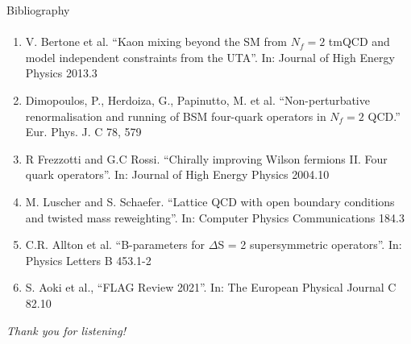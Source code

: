 \documentclass{beamer}
\begin{document}
\begin{frame}[noframenumbering]{Bibliography}
      \framesubtitle{\hspace*{1pt}}
      \begin{enumerate}
            \item V. Bertone et al. ``Kaon mixing beyond the SM from $N_f = 2$ tmQCD and model independent constraints from the UTA''. In: Journal of High Energy Physics 2013.3
            \item Dimopoulos, P., Herdoiza, G., Papinutto, M. et al. ``Non-perturbative renormalisation and running of BSM four-quark operators in $N_f = 2$ QCD.'' Eur. Phys. J. C 78, 579
            \item R Frezzotti and G.C Rossi. ``Chirally improving Wilson fermions II. Four quark operators''. In: Journal of High Energy Physics 2004.10
            \item M. Luscher and S. Schaefer. ``Lattice QCD with open boundary conditions and twisted mass reweighting''. In: Computer Physics Communications 184.3
            \item C.R. Allton et al. ``B-parameters for $\Delta$S = 2 supersymmetric operators''. In: Physics Letters B 453.1-2
            \item S. Aoki et al., ``FLAG Review 2021''. In: The European Physical Journal C 82.10
      \end{enumerate}
\end{frame}

\begin{chapter}{}{\emph{Thank you for listening!}}
      \framesubtitle{\hspace*{1pt}}
\end{chapter}
\end{document}
